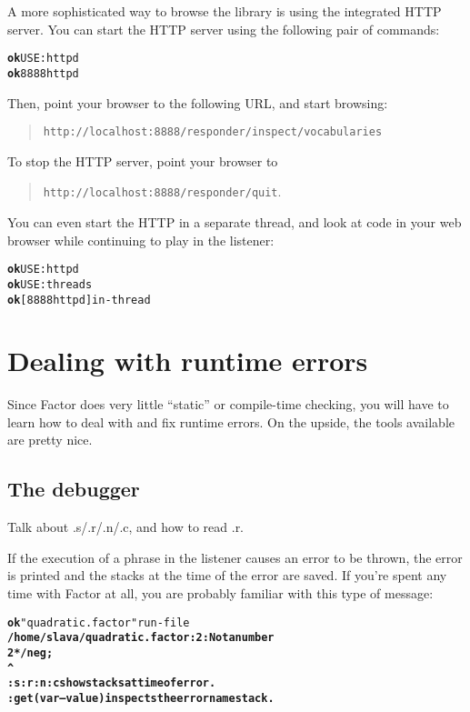 \documentclass{article}
\begin{document}
A more sophisticated way to browse the library is using the integrated HTTP server. You can start the HTTP server using the following pair of commands:

\begin{alltt}
\textbf{ok} USE: httpd
\textbf{ok} 8888 httpd
\end{alltt}

Then, point your browser to the following URL, and start browsing:

\begin{quote}
\texttt{http://localhost:8888/responder/inspect/vocabularies}
\end{quote}

To stop the HTTP server, point your browser to

\begin{quote}
\texttt{http://localhost:8888/responder/quit}.
\end{quote}

You can even start the HTTP in a separate thread, and look at code in your web browser while continuing to play in the listener:

\begin{alltt}
\textbf{ok} USE: httpd
\textbf{ok} USE: threads
\textbf{ok} [ 8888 httpd ] in-thread
\end{alltt}

\section{Dealing with runtime errors}

Since Factor does very little ``static'' or compile-time checking, you will have to learn how to deal with and fix runtime errors. On the upside, the tools available are pretty nice.

\subsection{The debugger}

Talk about .s/.r/.n/.c, and how to read .r.

If the execution of a phrase in the listener causes an error to be thrown, the error
is printed and the stacks at the time of the error are saved. If you're spent any
time with Factor at all, you are probably familiar with this type of message:

\begin{alltt}
\textbf{ok} "quadratic.factor" run-file
\textbf{/home/slava/quadratic.factor:2: Not a number
    2 * / neg ;
       ^
:s :r :n :c show stacks at time of error.
:get ( var -- value ) inspects the error namestack.}
\end{alltt}
\end{document}
